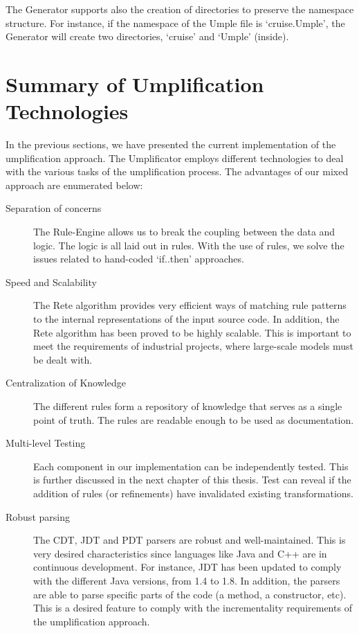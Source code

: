 The Generator supports also the creation of directories to preserve the namespace structure. For instance, if the namespace of the Umple file is `cruise.Umple', the Generator will create two directories, `cruise' and `Umple' (inside).

\section{Summary of Umplification Technologies}

In the previous sections, we have presented the current implementation of the umplification approach. The Umplificator employs different technologies to deal with the various tasks of the umplification process. 
The advantages of our mixed approach are enumerated below:

\begin{description}
\item [Separation of concerns] The Rule-Engine allows us to break the coupling between the data and logic. The logic is all laid out in rules. With the use of rules, we solve the issues related to hand-coded `if..then' approaches.

\item [Speed and Scalability] The Rete algorithm provides very efficient ways of matching rule patterns to the internal representations of the input source code. In addition, the Rete algorithm has been proved to be highly scalable. This is important to meet the requirements of industrial projects, where large-scale models must be dealt with.

\item [Centralization of Knowledge] The different rules form a repository of knowledge that serves as a single point of truth. The rules are readable enough to be used as documentation. 

\item [Multi-level Testing] Each component in our implementation can be independently tested. This is further discussed in the next chapter of this thesis. Test can reveal if the addition of rules (or refinements) have invalidated existing transformations.

\item [Robust parsing] The CDT, JDT and PDT parsers are robust and well-maintained. This is very desired characteristics since languages like Java and C++ are in continuous development. For instance, JDT has been updated to comply with the different Java versions, from 1.4 to 1.8. In addition, the parsers are able to parse specific parts of the code (a method, a constructor, etc). This is a desired feature to comply with the incrementality requirements of the umplification approach. 


\end{description}
